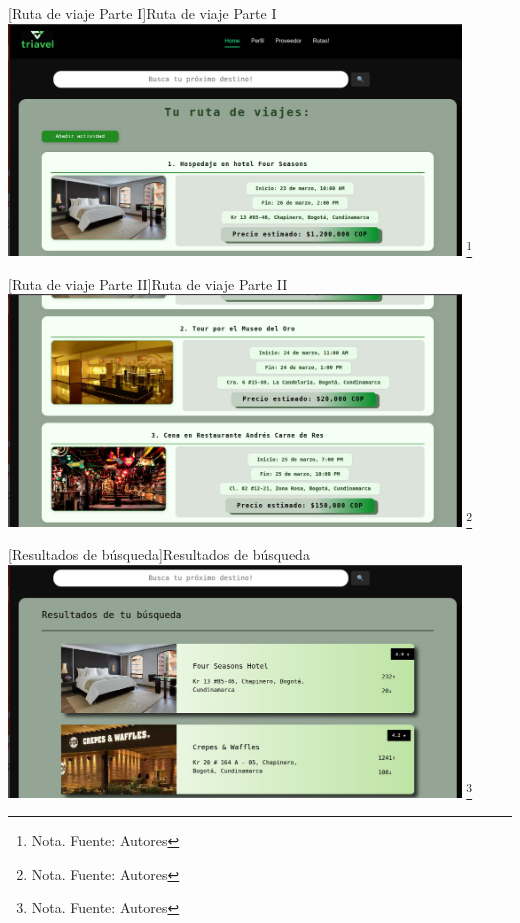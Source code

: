      \vspace{2mm}
    \begin{minipage}{0.9\textwidth}
    \centering
    [{Ruta de viaje Parte I}]{Ruta de viaje Parte I}
    \label{prot8}
    \includegraphics[width=0.9\textwidth]{Content/Images/RutaDeViaje1.png}
    \footnote{Nota. \textup{Fuente: Autores}}
    \end{minipage}

      \vspace{2mm}
    \begin{minipage}{0.9\textwidth}
    \centering
    [{Ruta de viaje Parte II}]{Ruta de viaje Parte II}
    \label{prot9}
    \includegraphics[width=0.9\textwidth]{Content/Images/RutaDeViaje2.png}
    \footnote{Nota. \textup{Fuente: Autores}}
    \end{minipage}

      \vspace{2mm}
    \begin{minipage}{0.9\textwidth}
    \centering
    [{Resultados de búsqueda}]{Resultados de búsqueda}
    \label{prot10}
    \includegraphics[width=0.9\textwidth]{Content/Images/ResultadosDeBusqueda.png}
    \footnote{Nota. \textup{Fuente: Autores}}
    \end{minipage}

